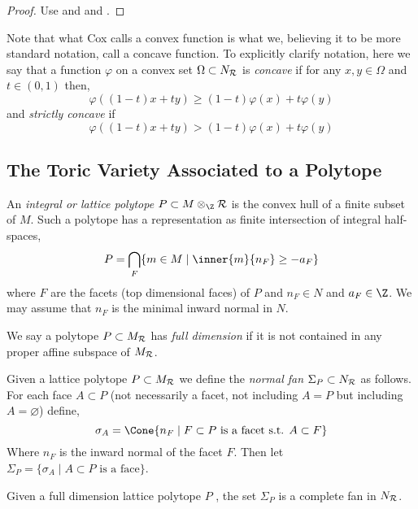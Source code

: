 \begin{proof}
Use \cite[Thm. 6.1.10]{cox} and \cite[Thm. 6.1.15]{cox} and \cite[Thm. 7.22]{cox}. 
\end{proof}

\begin{rmk}
Note that what Cox calls a convex function is what we, believing it to be more standard notation, call a concave function. To explicitly clarify notation, here we say that a function $\varphi$ on a convex set $\Omega \subset N_{\mathcal{R}}$ is \textit{concave} if for any $x, y \in \Omega$ and $t \in (0, 1)$ then,
\[ \varphi((1 - t) x + t y) \ge (1 - t) \varphi(x) + t \varphi(y) \]
and \textit{strictly concave} if 
\[ \varphi((1 - t) x + t y) > (1 - t) \varphi(x) + t \varphi(y) \]
\end{rmk}

\subsection{The Toric Variety Associated to a Polytope}

\begin{definition}
An \textit{integral or lattice polytope} $P \subset M \otimes_\Z \R$ is the convex hull of a finite subset of $M$. Such a polytope has a representation as finite intersection of integral half-spaces,
\[ P = \bigcap_F \{ m \in M \mid \inner{m}{n_F} \ge - a_F \} \]
where $F$ are the facets (top dimensional faces) of $P$ and $n_F \in N$ and $a_F \in \Z$. We may assume that $n_F$ is the minimal inward normal in $N$.
\end{definition}

\begin{defn}
We say a polytope $P \subset M_{\mathcal{R}}$ has \textit{full dimension} if it is not contained in any proper affine subspace of $M_{\mathcal{R}}$.
\end{defn}

\begin{definition}
Given a lattice polytope $P \subset M_{\mathcal{R}}$ we define the \textit{normal fan} $\Sigma_P \subset N_{\mathcal{R}}$ as follows. For each face $A \subset P$ (not necessarily a facet, not including $A = P$ but including $A = \varnothing$) define,
\[ \sigma_A = \Cone{ n_F \mid F \subset P \text{ is a facet s.t. } A \subset F } \]
Where $n_F$ is the inward normal of the facet $F$. Then let $\Sigma_P = \{ \sigma_A \mid A \subset P \text{ is a face} \}$.
\end{definition}

\begin{proposition}
Given a full dimension lattice polytope $P$ , the set $\Sigma_P$ is a complete fan in $N_{\mathcal{R}}$.
\end{proposition}

